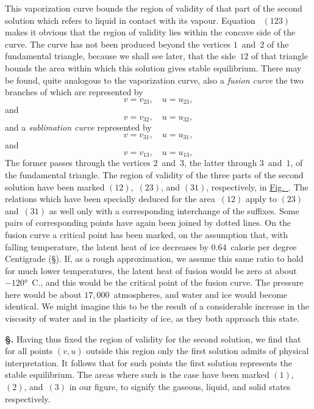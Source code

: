 \documentclass[12pt]{book}[2005/09/16]
\newcommand{\Section}[1]{
  \medskip\par\textbf{§\;#1}
  \label{section:#1}
}
\newcommand{\SecRef}[2][§\;]{\hyperref[section:#2.]{{\upshape #1#2}}}
\newcommand{\Eq}[1]{%
  \hyperref[eqn:#1]{\ensuremath{#1}}%
}
\newcommand{\Fig}[1]{\hyperref[fig:#1]{Fig.~{\upshape #1}}}
\newcommand{\PageSep}[1]{\ignorespaces}
\begin{document}
This vaporization curve bounds the region of validity
of that part of the second solution which refers to liquid in
contact with its vapour. Equation~\Eq{(123)} makes it obvious
that the region of validity lies within the concave side of
the curve. The curve has not been produced beyond the
vertices $1$~and~$2$ of the fundamental triangle, because we
shall see later, that the side~$12$ of that triangle bounds the
area within which this solution gives stable equilibrium.
There may be found, quite analogous to the vaporization
curve, also a \emph{fusion curve} the two branches of which are
represented by
\[
v = v_{23},\quad
u = u_{23},
\]
and
\[
v = v_{32},\quad
u = u_{32},
\]
and a \emph{sublimation curve} represented by
\[
v = v_{31},\quad
u = u_{31},
\]
and
\[
v = v_{13},\quad
u = u_{13},
\]
The former passes through the vertices $2$~and~$3$, the latter
through $3$~and~$1$, of the fundamental triangle. The region
of validity of the three parts of the second solution have been
marked $(12)$,~$(23)$, and $(31)$, respectively, in \Fig{4}. The
relations which have been specially deduced for the area~$(12)$
apply to $(23)$ and~$(31)$ as well only with a corresponding
\PageSep{162}
interchange of the suffixes. Some pairs of corresponding
points have again been joined by dotted lines. On the
fusion curve a critical point has been marked, on the
assumption that, with falling temperature, the latent heat of
ice decreases by $0.64$~calorie per degree Centigrade (\SecRef{183}).
If, as a rough approximation, we assume this same ratio to
hold for much lower temperatures, the latent heat of fusion
would be zero at about $-120°$~C., and this would be the
critical point of the fusion curve. The pressure here would
be about $17,000$~atmospheres, and water and ice would
become identical. We might imagine this to be the result
of a considerable increase in the viscosity of water and in
the plasticity of ice, as they both approach this state.

\Section{192.} Having thus fixed the region of validity for the
second solution, we find that for all points $(v, u)$ outside this
region only the first solution admits of physical interpretation.
It follows that for such points the first solution represents
the stable equilibrium. The areas where such is the case
have been marked $(1)$,~$(2)$, and~$(3)$ in our figure, to signify
the gaseous, liquid, and solid states respectively.
\end{document}
